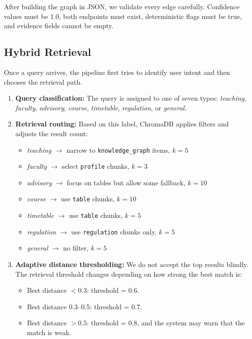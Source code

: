 \documentclass[12pt,a4paper]{report}
\begin{document}
After building the graph in JSON, we validate every edge carefully. Confidence values must be 1.0, both endpoints must exist, deterministic flags must be true, and evidence fields cannot be empty.

\subsection{Hybrid Retrieval}

Once a query arrives, the pipeline first tries to identify user intent and then chooses the retrieval path.

\begin{enumerate}
  \item \textbf{Query classification:} The query is assigned to one of seven types: \textit{teaching}, \textit{faculty}, \textit{advisory}, \textit{course}, \textit{timetable}, \textit{regulation}, or \textit{general}.
  \item \textbf{Retrieval routing:} Based on this label, ChromaDB applies filters and adjusts the result count:
    \begin{itemize}
      \item \textit{teaching} $\rightarrow$ narrow to \texttt{knowledge\_graph} items, $k=5$
      \item \textit{faculty} $\rightarrow$ select \texttt{profile} chunks, $k=3$
      \item \textit{advisory} $\rightarrow$ focus on tables but allow some fallback, $k=10$
      \item \textit{course} $\rightarrow$ use \texttt{table} chunks, $k=10$
      \item \textit{timetable} $\rightarrow$ use \texttt{table} chunks, $k=5$
      \item \textit{regulation} $\rightarrow$ use \texttt{regulation} chunks only, $k=5$
      \item \textit{general} $\rightarrow$ no filter, $k=5$
    \end{itemize}
  \item \textbf{Adaptive distance thresholding:} We do not accept the top results blindly. The retrieval threshold changes depending on how strong the best match is:
    \begin{itemize}
      \item Best distance $< 0.3$: threshold = 0.6.
      \item Best distance 0.3--0.5: threshold = 0.7.
      \item Best distance $> 0.5$: threshold = 0.8, and the system may warn that the match is weak.
    \end{itemize}
\end{enumerate}
\end{document}
